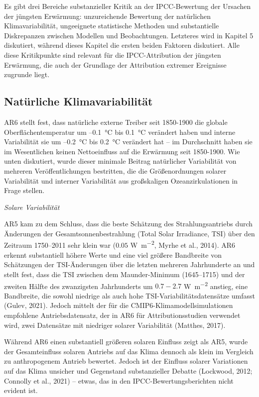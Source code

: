 \documentclass[12pt,paper=a4,DIV=12,parskip=never,chapterprefix=false,headings=standardclasses]{scrreprt}
\begin{document}
Es gibt drei Bereiche substanzieller Kritik an der IPCC-Bewertung der Ursachen der jüngsten Erwärmung: unzureichende Bewertung der natürlichen Klimavariabilität, ungeeignete statistische Methoden und substantielle Diskrepanzen zwischen Modellen und Beobachtungen. Letzteres wird in Kapitel 5 diskutiert, während dieses Kapitel die ersten beiden Faktoren diskutiert. Alle diese Kritikpunkte sind relevant für die IPCC-Attribution der jüngsten Erwärmung, die auch der Grundlage der Attribution extremer Ereignisse zugrunde liegt.


\subsection{Natürliche Klimavariabilität}
AR6 stellt fest, dass natürliche externe Treiber seit 1850-1900 die globale Oberflächentemperatur um –\SI{0.1}{\celsius} bis \SI{+0.1}{\celsius} verändert haben und interne Variabilität sie um –\SI{0.2}{\celsius} bis \SI{+0.2}{\celsius} verändert hat – im Durchschnitt haben sie im Wesentlichen keinen Nettoeinfluss auf die Erwärmung seit 1850-1900. Wie unten diskutiert, wurde dieser minimale Beitrag natürlicher Variabilität von mehreren Veröffentlichungen bestritten, die die Größenordnungen solarer Variabilität und interner Variabilität aus großskaligen Ozeanzirkulationen in Frage stellen.

\emph{Solare Variabilität}

AR5 kam zu dem Schluss, dass die beste Schätzung des Strahlungsantriebs durch Änderungen der Gesamtsonnenbestrahlung (Total Solar Irradiance, TSI) über den Zeitraum 1750–2011 sehr klein war ($0.05$ \si{\watt\per\square\meter}, Myrhe et al., 2014). AR6 erkennt substantiell höhere Werte und eine viel größere Bandbreite von Schätzungen der TSI-Änderungen über die letzten mehreren Jahrhunderte an und stellt fest, dass die TSI zwischen dem Maunder-Minimum (1645–1715) und der zweiten Hälfte des zwanzigsten Jahrhunderts um $0.7 - 2.7$ \si{\watt\per\square\meter} anstieg, eine Bandbreite, die sowohl niedrige als auch hohe TSI-Variabilitätsdatensätze umfasst (Gulev, 2021). Jedoch mittelt der für die CMIP6-Klimamodellsimulationen empfohlene Antriebsdatensatz, der in AR6 für Attributionsstudien verwendet wird, zwei Datensätze mit niedriger solarer Variabilität (Matthes, 2017).

Während AR6 einen substantiell größeren solaren Einfluss zeigt als AR5, wurde der Gesamteinfluss solaren Antriebs auf das Klima dennoch als klein im Vergleich zu anthropogenem Antrieb bewertet. Jedoch ist der Einfluss solarer Variationen auf das Klima unsicher und Gegenstand substanzieller Debatte (Lockwood, 2012; Connolly et al., 2021) – etwas, das in den IPCC-Bewertungsberichten nicht evident ist.
\end{document}
